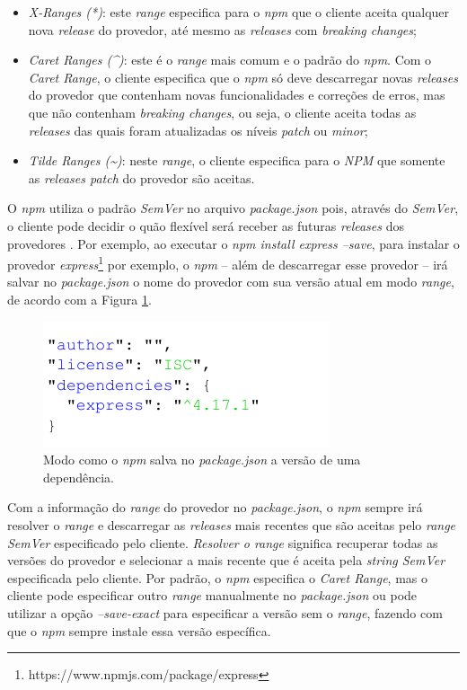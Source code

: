 \begin{itemize}
    \item \textit{X-Ranges (*)}: este \textit{range} especifica para o \textit{npm} que o cliente aceita qualquer nova \textit{release} do provedor, até mesmo as \textit{releases} com \textit{breaking changes};
    \item \textit{Caret Ranges (\textasciicircum)}: este é o \textit{range} mais comum e o padrão do \textit{npm}. Com o \textit{Caret Range}, o cliente especifica que o \textit{npm} só deve descarregar novas \textit{releases} do provedor que contenham novas funcionalidades e correções de erros, mas que não contenham \textit{breaking changes}, ou seja, o cliente aceita todas as \textit{releases} das quais foram atualizadas os níveis \textit{patch} ou \textit{minor};
    \item \textit{Tilde Ranges (\textasciitilde)}: neste \textit{range}, o cliente especifica para o \textit{NPM} que somente as \textit{releases patch} do provedor são aceitas.
\end{itemize}{}

O \textit{npm} utiliza o padrão \textit{SemVer} no arquivo \textit{package.json} pois, através do \textit{SemVer}, o cliente pode decidir o quão flexível será receber as futuras \textit{releases} dos provedores \cite{decan}. Por exemplo, ao executar o \textit{npm install express --save}, para instalar o provedor \textit{express}\footnote{https://www.npmjs.com/package/express} por exemplo, o \textit{npm} -- além de descarregar esse provedor -- irá salvar no \textit{package.json} o nome do provedor com sua versão atual em modo \textit{range}, de acordo com a Figura \ref{fig:dep_express}.

\begin{figure}
    \centering
    \includegraphics[scale=1.3]{figuras/dependencies_express.pdf}
    \caption{Modo como o \textit{npm} salva no \textit{package.json} a versão de uma dependência.}
    \label{fig:dep_express}
\end{figure}{}

Com a informação do \textit{range} do provedor no \textit{package.json}, o \textit{npm} sempre irá resolver o \textit{range} e descarregar as \textit{releases} mais recentes que são aceitas pelo \textit{range SemVer} especificado pelo cliente. \textit{Resolver o range} significa recuperar todas as versões do provedor e selecionar a mais recente que é aceita pela \textit{string SemVer} especificada pelo cliente. Por padrão, o \textit{npm} especifica o \textit{Caret Range}, mas o cliente pode especificar outro \textit{range} manualmente no \textit{package.json} ou pode utilizar a opção \textit{--save-exact} para especificar a versão sem o \textit{range}, fazendo com que o \textit{npm} sempre instale essa versão específica.

